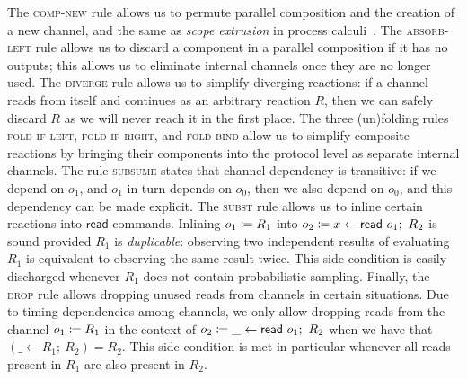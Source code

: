 The \textsc{comp-new} rule allows us to permute parallel composition and the creation of a new channel, and the same as \emph{scope
extrusion} in process calculi~\cite{picalc}. The \textsc{absorb-left} 
rule allows us to discard a component in a parallel composition if it has no outputs; this allows us to eliminate internal channels once they are no longer used. The \textsc{diverge} rule allows us to simplify diverging reactions: if a channel reads from itself and continues as an arbitrary reaction $R$, then we can safely discard $R$ as we will never reach it in the first place. The three (un)folding rules \textsc{fold-if-left}, \textsc{fold-if-right}, and \textsc{fold-bind} allow us to simplify composite reactions by bringing their
components into the protocol level as separate internal channels. The rule \textsc{subsume} states that channel dependency is transitive: if we depend on $o_1$, and $o_1$ in turn depends on $o_0$, then we also depend on $o_0$, and this dependency can be made explicit. The \textsc{subst} rule allows us to inline certain reactions into $\mathsf{read}$ commands. Inlining $o_1 \coloneqq R_1$ into $\assign{o_2}{x \leftarrow \read{o_1}; \ R_2}$ is sound provided $R_1$ is \emph{duplicable}: observing two independent results of evaluating $R_1$ is equivalent to observing the same result twice. This side condition is easily discharged whenever $R_1$ does not contain probabilistic
sampling. Finally, the \textsc{drop} rule allows dropping unused reads from channels in certain situations. Due to timing dependencies among channels, we only allow dropping reads from the channel $o_1 \coloneqq R_1$ in the context of $\assign{o_2}{\_ \leftarrow \read{o_1};\ R_2}$ when we have that $(\_ \leftarrow R_1; \ R_2) = R_2$. This side condition is met in particular whenever all reads present in $R_1$ are also present in $R_2$.

